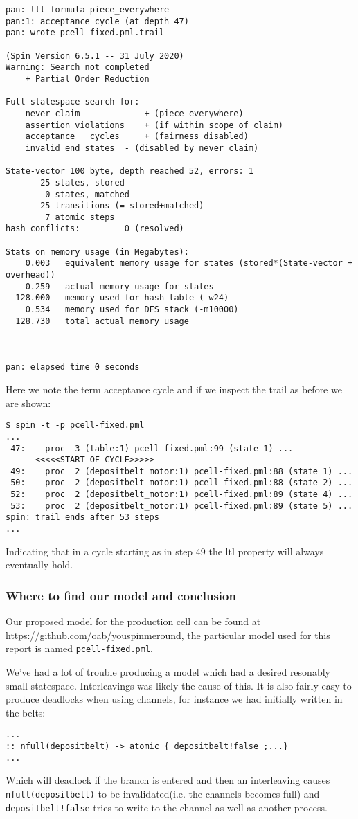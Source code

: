 \documentclass[12pt]{article}
\begin{document}
\begin{verbatim}
pan: ltl formula piece_everywhere
pan:1: acceptance cycle (at depth 47)
pan: wrote pcell-fixed.pml.trail

(Spin Version 6.5.1 -- 31 July 2020)
Warning: Search not completed
	+ Partial Order Reduction

Full statespace search for:
	never claim         	+ (piece_everywhere)
	assertion violations	+ (if within scope of claim)
	acceptance   cycles 	+ (fairness disabled)
	invalid end states	- (disabled by never claim)

State-vector 100 byte, depth reached 52, errors: 1
       25 states, stored
        0 states, matched
       25 transitions (= stored+matched)
        7 atomic steps
hash conflicts:         0 (resolved)

Stats on memory usage (in Megabytes):
    0.003	equivalent memory usage for states (stored*(State-vector + overhead))
    0.259	actual memory usage for states
  128.000	memory used for hash table (-w24)
    0.534	memory used for DFS stack (-m10000)
  128.730	total actual memory usage



pan: elapsed time 0 seconds
\end{verbatim}
Here we note the term acceptance cycle and if we inspect the trail as before
we are shown:
\begin{verbatim}
$ spin -t -p pcell-fixed.pml
...
 47:	proc  3 (table:1) pcell-fixed.pml:99 (state 1) ...
      <<<<<START OF CYCLE>>>>>
 49:	proc  2 (depositbelt_motor:1) pcell-fixed.pml:88 (state 1) ...
 50:	proc  2 (depositbelt_motor:1) pcell-fixed.pml:88 (state 2) ...
 52:	proc  2 (depositbelt_motor:1) pcell-fixed.pml:89 (state 4) ...
 53:	proc  2 (depositbelt_motor:1) pcell-fixed.pml:89 (state 5) ...
spin: trail ends after 53 steps
...
\end{verbatim}
Indicating that in a cycle starting as in step 49 the ltl property will always eventually
hold.
\subsubsection*{Where to find our model and conclusion}
Our proposed model for the production cell can be found at \url{https://github.com/oab/youspinmeround}, the
particular model used for this report is named \texttt{pcell-fixed.pml}.

We've had a lot of trouble producing a model which had a desired resonably small statespace. Interleavings
was likely the cause of this. It is also fairly easy to produce deadlocks when using channels, for
instance we had initially written in the belts:
\begin{verbatim}
...
:: nfull(depositbelt) -> atomic { depositbelt!false ;...}
...
\end{verbatim}
Which will  deadlock if the branch is entered and then an interleaving causes \texttt{nfull(depositbelt)} to be
invalidated(i.e. the channels becomes full) and \texttt{depositbelt!false} tries to write to the channel as well as
another process.
\end{document}
